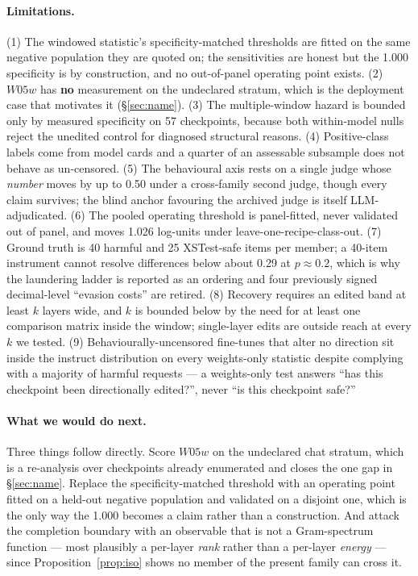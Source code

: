 \documentclass[11pt,letterpaper]{article}
\begin{document}
\paragraph{Limitations.} (1) The windowed statistic's specificity-matched thresholds are fitted on the same negative population they are quoted on; the sensitivities are honest but the 1.000 specificity is by construction, and no out-of-panel operating point exists. (2) $W05w$ has \textbf{no} measurement on the undeclared stratum, which is the deployment case that motivates it (\S\ref{sec:name}). (3) The multiple-window hazard is bounded only by measured specificity on 57 checkpoints, because both within-model nulls reject the unedited control for diagnosed structural reasons. (4) Positive-class labels come from model cards and a quarter of an assessable subsample does not behave as un-censored. (5) The behavioural axis rests on a single judge whose \emph{number} moves by up to 0.50 under a cross-family second judge, though every claim survives; the blind anchor favouring the archived judge is itself LLM-adjudicated. (6) The pooled operating threshold is panel-fitted, never validated out of panel, and moves 1.026 log-units under leave-one-recipe-class-out. (7) Ground truth is 40 harmful and 25 XSTest-safe items per member; a 40-item instrument cannot resolve differences below about 0.29 at $p \approx 0.2$, which is why the laundering ladder is reported as an ordering and four previously signed decimal-level ``evasion costs'' are retired. (8) Recovery requires an edited band at least $k$ layers wide, and $k$ is bounded below by the need for at least one comparison matrix inside the window; single-layer edits are outside reach at every $k$ we tested. (9) Behaviourally-uncensored fine-tunes that alter no direction sit inside the instruct distribution on every weights-only statistic despite complying with a majority of harmful requests --- a weights-only test answers ``has this checkpoint been directionally edited?'', never ``is this checkpoint safe?''

\paragraph{What we would do next.} Three things follow directly. Score $W05w$ on the undeclared chat stratum, which is a re-analysis over checkpoints already enumerated and closes the one gap in \S\ref{sec:name}. Replace the specificity-matched threshold with an operating point fitted on a held-out negative population and validated on a disjoint one, which is the only way the 1.000 becomes a claim rather than a construction. And attack the completion boundary with an observable that is not a Gram-spectrum function --- most plausibly a per-layer \emph{rank} rather than a per-layer \emph{energy} --- since Proposition~\ref{prop:iso} shows no member of the present family can cross it.
\end{document}
